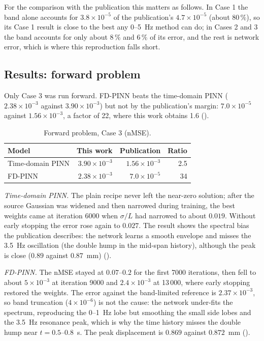 For the comparison with the publication this matters as follows. In Case 1 the band alone accounts for $3.8\times10^{-5}$ of the publication's $4.7\times10^{-5}$ (about $80\,\%$), so its Case 1 result is close to the best any 0--5~Hz method can do; in Cases 2 and 3 the band accounts for only about $8\,\%$ and $6\,\%$ of its error, and the rest is network error, which is where this reproduction falls short.

\subsection*{Results: forward problem}

Only Case 3 was run forward. FD-PINN beats the time-domain PINN ($2.38\times10^{-3}$ against $3.90\times10^{-3}$) but not by the publication's margin: $7.0\times10^{-5}$ against $1.56\times10^{-3}$, a factor of 22, where this work obtains 1.6 ().

\begin{table}[tbp]
\centering\footnotesize
\caption{Forward problem, Case 3 (nMSE).}\label{tab:vf-fd-fwd}
\begin{tabular}{@{}lrrr@{}}
\toprule
Model & This work & Publication & Ratio\\
\midrule
Time-domain PINN & $3.90\times10^{-3}$ & $1.56\times10^{-3}$ & 2.5\\
FD-PINN & $2.38\times10^{-3}$ & $7.0\times10^{-5}$ & 34\\
\bottomrule
\end{tabular}
\end{table}

\emph{Time-domain PINN.} The plain recipe never left the near-zero solution; after the source Gaussian was widened and then narrowed during training, the best weights came at iteration 6000 when $\sigma/L$ had narrowed to about $0.019$. Without early stopping the error rose again to $0.027$. The result shows the spectral bias the publication describes: the network learns a smooth envelope and misses the 3.5~Hz oscillation (the double hump in the mid-span history), although the peak is close ($0.89$ against $0.87$~mm) ().

\emph{FD-PINN.} The nMSE stayed at $0.07$--$0.2$ for the first 7000 iterations, then fell to about $5\times10^{-3}$ at iteration 9000 and $2.4\times10^{-3}$ at 13\,000, where early stopping restored the weights. The error against the band-limited reference is $2.37\times10^{-3}$, so band truncation ($4\times10^{-6}$) is not the cause: the network under-fits the spectrum, reproducing the 0--1~Hz lobe but smoothing the small side lobes and the 3.5~Hz resonance peak, which is why the time history misses the double hump near $t=0.5$--$0.8$~s. The peak displacement is $0.869$ against $0.872$~mm ().

